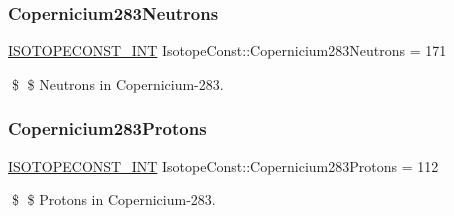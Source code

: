 \subsubsection{\texorpdfstring{Copernicium283\+Neutrons}{Copernicium283Neutrons}}
{\footnotesize\ttfamily \mbox{\hyperlink{group___isotope_const-_macros_ga5f18360b3e99483a35c32d789e62621c}{I\+S\+O\+T\+O\+P\+E\+C\+O\+N\+S\+T\+\_\+\+I\+NT}} Isotope\+Const\+::\+Copernicium283\+Neutrons = 171}

\$ \$ Neutrons in Copernicium-\/283. \mbox{\label{group___isotope_const-_copernicium-_cn283_ga0c682c9dcb029a594dcd4fe19869f39d}} 
\subsubsection{\texorpdfstring{Copernicium283\+Protons}{Copernicium283Protons}}
{\footnotesize\ttfamily \mbox{\hyperlink{group___isotope_const-_macros_ga5f18360b3e99483a35c32d789e62621c}{I\+S\+O\+T\+O\+P\+E\+C\+O\+N\+S\+T\+\_\+\+I\+NT}} Isotope\+Const\+::\+Copernicium283\+Protons = 112}

\$ \$ Protons in Copernicium-\/283. 